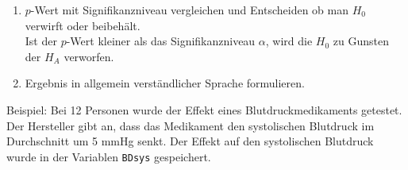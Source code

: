 \documentclass[
]{book}
\begin{document}
\begin{enumerate}
\def\labelenumi{\arabic{enumi}.}
\setcounter{enumi}{6}
\item
  \(p\)-Wert mit Signifikanzniveau vergleichen und Entscheiden ob man \(H_0\) verwirft oder beibehält.\\
  Ist der \(p\)-Wert kleiner als das Signifikanzniveau \(\alpha\), wird die \(H_0\) zu Gunsten der \(H_A\) verworfen.
\item
  Ergebnis in allgemein verständlicher Sprache formulieren.
\end{enumerate}

Beispiel: Bei 12 Personen wurde der Effekt eines Blutdruckmedikaments getestet. Der Hersteller gibt an, dass das Medikament den systolischen Blutdruck im Durchschnitt um 5 mmHg senkt. Der Effekt auf den systolischen Blutdruck wurde in der Variablen \texttt{BDsys} gespeichert.
\end{document}
